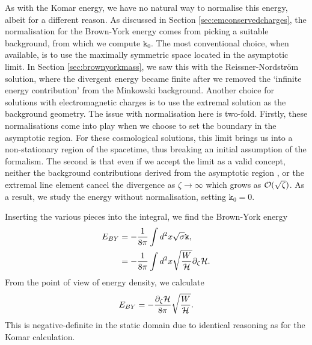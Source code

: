 As with the Komar energy, we have no natural way to normalise this energy, albeit for a different reason. As discussed in Section \ref{sec:emconservedcharges}, the normalisation for the Brown-York energy comes from picking a suitable background, from which we compute $\mathtt{k}_0$. The most conventional choice, when available, is to use the maximally symmetric space located in the asymptotic limit. In Section \ref{sec:brownyorkmass}, we saw this with the Reissner-Nordstr\"om solution, where the divergent energy became finite after we removed the `infinite energy contribution' from the Minkowski background. Another choice for solutions with electromagnetic charges is to use the extremal solution as the background geometry. The issue with normalisation here is two-fold. Firstly, these normalisations come into play when we choose to set the boundary in the asymptotic region. For these cosmological solutions, this limit brings us into a non-stationary region of the spacetime, thus breaking an initial assumption of the formalism. The second is that even if we accept the limit as a valid concept, neither the background contributions derived from the asymptotic region , or the extremal line element  cancel the divergence as $\zeta \to \infty$ which grows as ${\cal O}(\sqrt{\zeta})$. As a result, we study the energy without normalisation, setting $\mathtt{k}_0 = 0$.

Inserting the various pieces into the integral, we find the Brown-York energy
\begin{equation}
\begin{aligned}
E_{BY} &= -\frac{1}{8 \pi} \int d^2 x \sqrt{\sigma} \mathtt{k}, \\
        &= - \frac{1}{8 \pi} \int d^2x \sqrt{\frac{W}{{\cal H}}}\partial_{\zeta} {\cal H}.
\end{aligned}
\end{equation}
From the point of view of energy density, we calculate
\begin{equation}
E_{BY} = - \frac{\partial_{\zeta} {\cal H}}{8 \pi} \sqrt{\frac{W}{{\cal H}}}.
\end{equation}
This is negative-definite in the static domain due to identical reasoning as for the Komar calculation.

